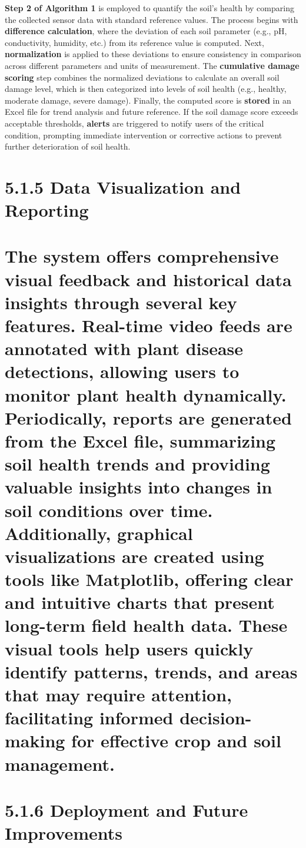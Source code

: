 \documentclass{book} %
\begin{document}
\noindent \textbf{Step 2 of Algorithm 1} is employed to quantify the soil's health by comparing the collected sensor data with standard reference values. The process begins with \textbf{difference calculation}, where the deviation of each soil parameter (e.g., pH, conductivity, humidity, etc.) from its reference value is computed. Next, \textbf{normalization} is applied to these deviations to ensure consistency in comparison across different parameters and units of measurement. The \textbf{cumulative damage scoring} step combines the normalized deviations to calculate an overall soil damage level, which is then categorized into levels of soil health (e.g., healthy, moderate damage, severe damage). Finally, the computed score is \textbf{stored} in an Excel file for trend analysis and future reference. If the soil damage score exceeds acceptable thresholds, \textbf{alerts} are triggered to notify users of the critical condition, prompting immediate intervention or corrective actions to prevent further deterioration of soil health.

\noindent 
\section{5.1.5 Data Visualization and Reporting}

\noindent 
\section{The system offers comprehensive visual feedback and historical data insights through several key features. Real-time video feeds are annotated with plant disease detections, allowing users to monitor plant health dynamically. Periodically, reports are generated from the Excel file, summarizing soil health trends and providing valuable insights into changes in soil conditions over time. Additionally, graphical visualizations are created using tools like Matplotlib, offering clear and intuitive charts that present long-term field health data. These visual tools help users quickly identify patterns, trends, and areas that may require attention, facilitating informed decision-making for effective crop and soil management.}

\noindent \textbf{}

\noindent 
\section{5.1.6 Deployment and Future Improvements}
\end{document}
